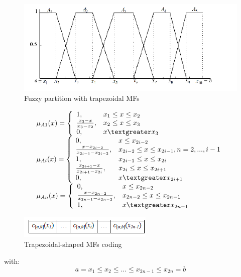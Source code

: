 \documentclass[runningheads,a4paper]{llncs}
\begin{document}
\begin{figure}[!h]
	\begin{center}
		\includegraphics[scale=0.95]{fig/pr}
		\caption {Fuzzy partition  with trapezoidal MFs}
		\label{prtr} 
	\end{center}
\end{figure}
\begin{equation} 
\begin{tabular}{l}
$\mu_{A1}(x)=  \left \{
\begin{array}{ll}
1, &x_{1} \leq x \leq x_{2}\\
\frac{x_{3} - x}{x_{3} - x_{2}}, &x_{2} \leq x \leq x_{3}\\
0        , &x \textgreater x_{3}\\
\end{array} 
\right.$		\\ 	
$\mu_{Ai}(x)= \left \{
\begin{array}{ll} 
0, &x \leq x_{2i-2}\\
\frac{x - x_{2i-2}}{x_{2i-1} - x_{2i-2}}, &x_{2i-2} \leq x \leq x_{2i-1},n=2,...,i-1\\
1, & x_{2i-1} \leq x \leq x_{2i}\\
\frac{x_{2i+1} - x}{x_{2i+1} - x_{2i}},& x_{2i} \leq x \leq x_{2i+1}\\
0  , &x \textgreater x_{2i+1}\\
\end{array}  
\right.	$		\\
$\mu_{An}(x)= \left \{
\begin{array}{ll} 
0, &x \leq x_{2n-2}\\
\frac{x - x_{2n-2}}{x_{2n-1} - x_{2n-2}},& x_{2n-2} \leq x \leq x_{2n-1}\\
1 ,& x \textgreater x_{2n-1} 
\end{array} 
\right.$\\
\label{e1}
\end{tabular}
\end{equation}
\begin{figure}[!h] 
	\begin{center}
		\includegraphics[scale=0.95]{fig/at}
		\caption {Trapezoidal-shaped MFs coding}
		\label{at}
	\end{center}
\end{figure}
with:
\begin{equation}
a = x_{1} \leq x_{2} \leq...\leq x_{2n-1} \leq x_{2n}=b 	
\end{equation}		
\end{document}
